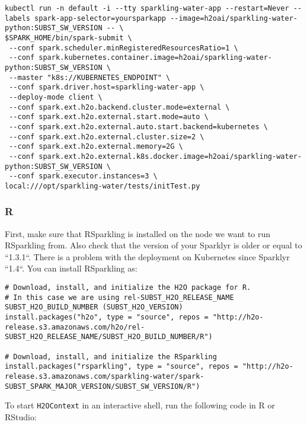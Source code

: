 \begin{lstlisting}[style=Bash]
kubectl run -n default -i --tty sparkling-water-app --restart=Never --labels spark-app-selector=yoursparkapp --image=h2oai/sparkling-water-python:SUBST_SW_VERSION -- \
$SPARK_HOME/bin/spark-submit \
 --conf spark.scheduler.minRegisteredResourcesRatio=1 \
 --conf spark.kubernetes.container.image=h2oai/sparkling-water-python:SUBST_SW_VERSION \
 --master "k8s://KUBERNETES_ENDPOINT" \
 --conf spark.driver.host=sparkling-water-app \
 --deploy-mode client \
 --conf spark.ext.h2o.backend.cluster.mode=external \
 --conf spark.ext.h2o.external.start.mode=auto \
 --conf spark.ext.h2o.external.auto.start.backend=kubernetes \
 --conf spark.ext.h2o.external.cluster.size=2 \
 --conf spark.ext.h2o.external.memory=2G \
 --conf spark.ext.h2o.external.k8s.docker.image=h2oai/sparkling-water-python:SUBST_SW_VERSION \
 --conf spark.executor.instances=3 \
local:///opt/sparkling-water/tests/initTest.py
\end{lstlisting}

\subsubsection{R}

First, make sure that RSparkling is installed on the node we want to run RSparkling from.  Also check that the version
of your Sparklyr is older or equal to ``1.3.1``. There is a problem with the deployment on Kubernetes since Sparklyr ``1.4``.
You can install RSparkling as:

\begin{lstlisting}[style=R]
# Download, install, and initialize the H2O package for R.
# In this case we are using rel-SUBST_H2O_RELEASE_NAME SUBST_H2O_BUILD_NUMBER (SUBST_H2O_VERSION)
install.packages("h2o", type = "source", repos = "http://h2o-release.s3.amazonaws.com/h2o/rel-SUBST_H2O_RELEASE_NAME/SUBST_H2O_BUILD_NUMBER/R")

# Download, install, and initialize the RSparkling
install.packages("rsparkling", type = "source", repos = "http://h2o-release.s3.amazonaws.com/sparkling-water/spark-SUBST_SPARK_MAJOR_VERSION/SUBST_SW_VERSION/R")
\end{lstlisting}

To start \texttt{H2OContext} in an interactive shell, run the following code in R or RStudio:

